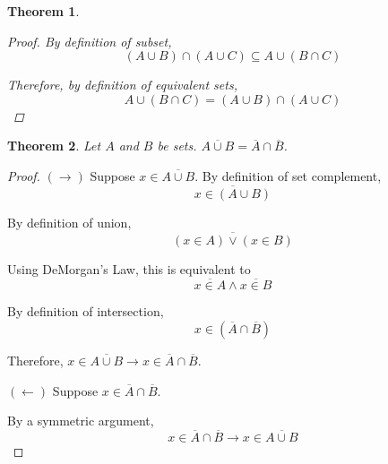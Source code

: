 \documentclass{article}
\newtheorem{theorem}{Theorem}
\numberwithin{subcase}{case}
\begin{document}
\begin{outline}[enumerate]
\begin{theorem}
\begin{proof}
            By definition of subset, 
            \begin{equation}
                (A \cup B) \cap (A \cup C) \subseteq A \cup (B \cap C)
            \end{equation}

            Therefore, by definition of equivalent sets, 
            \begin{equation}
                A \cup (B \cap C) = (A \cup B) \cap (A \cup C)
            \end{equation}
        \end{proof}
    \end{theorem}

    \1 \begin{theorem}
            Let $A$ and $B$ be sets. $\overline{A \cup B} = \overline{A} \cap \overline{B}$.
        \end{theorem}
        \begin{proof}
            $(\rightarrow)$ Suppose $x \in \overline{A \cup B}$. By 
            definition of set complement, 
            \begin{equation}
                \overline{x \in (A \cup B)}
            \end{equation} 

            By definition of union, 
            \begin{equation}
                \overline{(x \in A) \vee (x \in B)}
            \end{equation}

            Using DeMorgan's Law, this is equivalent to 
            \begin{equation}
                \overline{x \in A} \wedge \overline{x \in B}
            \end{equation}

            By definition of intersection,
            \begin{equation}
                x \in (\overline{A} \cap \overline{B})
            \end{equation}
            
            Therefore, $x \in \overline{A \cup B} \rightarrow x \in \overline{A} \cap \overline{B}$.

            $(\leftarrow)$ Suppose $x \in \overline{A} \cap \overline{B}$. 
            
            By a symmetric argument, 
            \begin{equation}
                x \in \overline{A} \cap \overline{B} \rightarrow x \in \overline{A \cup B}  
            \end{equation}
            

\end{proof}
\end{outline}
\end{document}
